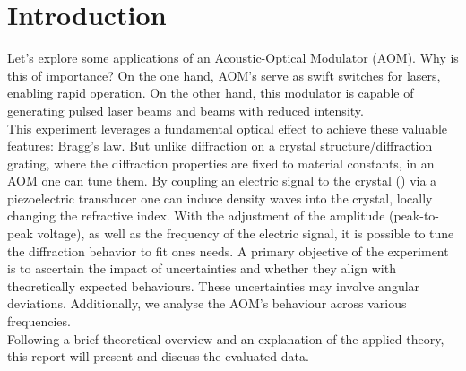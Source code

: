 \section{Introduction}
Let's explore some applications of an Acoustic-Optical Modulator (AOM). Why is this of importance? On the one hand, AOM's serve as swift switches for lasers, enabling rapid operation. On the other hand, this modulator is capable of generating pulsed laser beams and beams with reduced intensity. 
\\
\noindent This experiment leverages a fundamental optical effect to achieve these valuable features: Bragg's law. But unlike diffraction on a crystal structure/diffraction grating, where the diffraction properties are fixed to material constants, in an AOM one can tune them. By coupling an electric signal to the crystal () via a piezoelectric transducer one can induce density waves into the crystal, locally changing the refractive index. With the adjustment of the amplitude (peak-to-peak voltage), as well as the frequency of the electric signal, it is possible to tune the diffraction behavior to fit ones needs. A primary objective of the experiment is to ascertain the impact of uncertainties and whether they align with theoretically expected behaviours. These uncertainties may involve angular deviations. Additionally, we analyse the AOM's behaviour across various frequencies.
\\
\noindent Following a brief theoretical overview and an explanation of the applied theory, this report will present and discuss the evaluated data.
